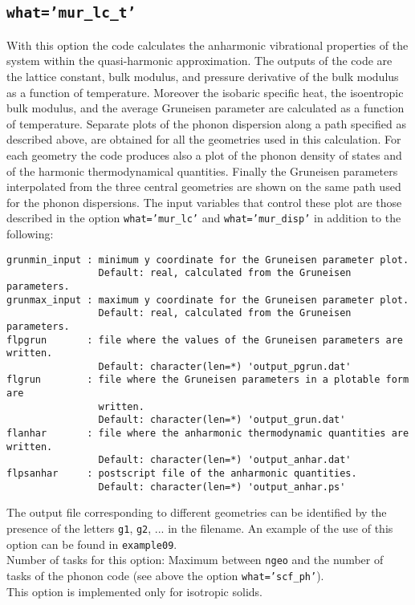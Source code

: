 \documentclass[12pt,a4paper]{article}
\begin{document}
\subsection{\texttt{what='mur\_lc\_t'}}
With this option the code calculates the anharmonic vibrational
properties of the system within the quasi-harmonic approximation. The
outputs of the code are the lattice constant, bulk modulus, and pressure
derivative of the bulk modulus as a function of temperature. Moreover
the isobaric specific heat, the isoentropic bulk modulus, and the average 
Gruneisen parameter are calculated as a function of temperature. Separate
plots of the phonon dispersion along a path specified as described above,
are obtained for all the geometries used in this calculation. For each
geometry the code produces also a plot of the phonon density of states
and of the harmonic thermodynamical quantities. Finally the Gruneisen
parameters interpolated from the three central geometries are
shown on the same path used for the phonon dispersions. The input variables
that control these plot are those described in the option
\texttt{what='mur\_lc'} and \texttt{what='mur\_disp'} in addition to the 
following:

\begin{verbatim}
grunmin_input : minimum y coordinate for the Gruneisen parameter plot.
                Default: real, calculated from the Gruneisen parameters.
grunmax_input : maximum y coordinate for the Gruneisen parameter plot.
                Default: real, calculated from the Gruneisen parameters.
flpgrun       : file where the values of the Gruneisen parameters are written. 
                Default: character(len=*) 'output_pgrun.dat'
flgrun        : file where the Gruneisen parameters in a plotable form are
                written.
                Default: character(len=*) 'output_grun.dat'
flanhar       : file where the anharmonic thermodynamic quantities are written.
                Default: character(len=*) 'output_anhar.dat'
flpsanhar     : postscript file of the anharmonic quantities.
                Default: character(len=*) 'output_anhar.ps'
\end{verbatim}
The output file corresponding to different geometries can be identified
by the presence of the letters \texttt{g1}, \texttt{g2}, ... in the filename.
An example of the use of this option can be found in \texttt{example09}. \\
Number of tasks for this option: Maximum between \texttt{ngeo} and the number
of tasks of the phonon code (see above the option \texttt{what='scf\_ph'}). \\
This option is implemented only for isotropic solids.
\end{document}
